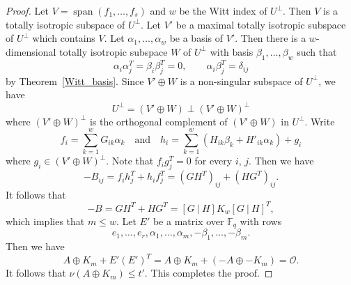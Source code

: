 \documentclass{article}
\theoremstyle{definition}
\theoremstyle{remark}
\begin{document}
\begin{proof}
    Let $V=\operatorname{span}(f_1, \ldots, f_s)$ and $w$ be the Witt index of $U^\perp$. Then $V$ is a totally isotropic subspace of $U^\perp$. Let $V'$ be a maximal totally isotropic subspace of $U^\perp$ which contains $V$. Let $\alpha_1, \ldots, \alpha_w$ be a basis of $V'$. Then there is a $w$-dimensional totally isotropic subspace $W$ of $U^\perp$ with basis $\beta_1, \ldots, \beta_w$ such that
    \[
        \alpha_i\alpha_j^T=\beta_i\beta_j^T=0,\qquad \alpha_i\beta_j^T=\delta_{ij}
    \]
    by Theorem~\ref{Witt_basis}. Since $V'\oplus W$ is a non-singular subspace of $U^\perp$, we have
    \[
    U^\perp=(V'\oplus W)\perp (V'\oplus W)^\perp
    \]
    where $(V'\oplus W)^\perp$ is the orthogonal complement of $(V'\oplus W)$ in $U^\perp$. Write
    \[
    f_i=\sum_{k=1}^wG_{ik}\alpha_k\quad\mbox{and}\quad h_i=\sum_{k=1}^w(H_{ik}\beta_k+H'_{ik}\alpha_k)+g_i
    \]
    where $g_i\in (V'\oplus W)^\perp$. Note that $f_ig_j^T=0$ for every $i,\,j$.  Then we have
    \[
    -B_{ij}=f_ih_j^T+h_if_j^T=(GH^T)_{ij}+(HG^T)_{ij}.
    \]
    It follows that
    \[
    -B=GH^T+HG^T=[G~|~H]K_w[G~|~H]^T,
    \]
    which implies that $m\le w$. Let $E'$ be a matrix over $\mathbb{F}_q$ with rows
    \[
    e_1, \ldots, e_r, \alpha_1, \ldots, \alpha_m, -\beta_1, \ldots, -\beta_m.
    \]
    Then we have
    \[
    A\oplus K_m+E'(E')^T=A\oplus K_m+(-A\oplus -K_m)=\mathcal{O}.
    \]
    It follows that $\nu(A\oplus K_m)\le t'$. This completes the proof.
\end{proof}
\end{document}

